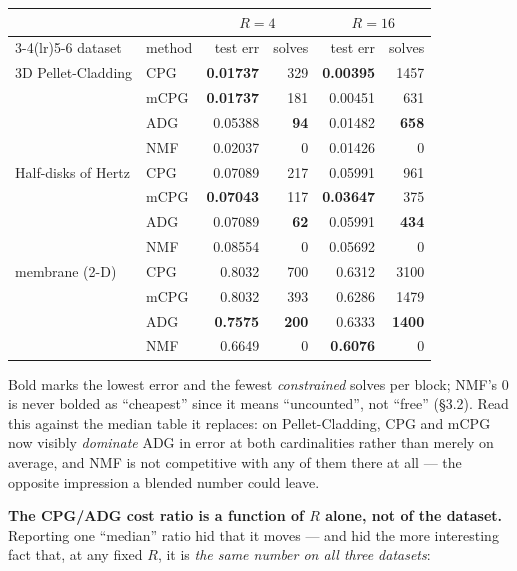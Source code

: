 \documentclass[11pt,a4paper]{article}
\begin{document}
\begin{center}
\begin{tabular}{@{}ll rr rr@{}}
\toprule
& & \multicolumn{2}{c}{$R=4$} & \multicolumn{2}{c}{$R=16$} \\
\cmidrule(lr){3-4}\cmidrule(lr){5-6}
dataset & method & test err & solves & test err & solves \\
\midrule
3D Pellet-Cladding & CPG  & \textbf{0.01737} & 329 & \textbf{0.00395} & 1457 \\
                   & mCPG & \textbf{0.01737} & 181 & 0.00451 & 631 \\
                   & ADG  & 0.05388 & \textbf{94}  & 0.01482 & \textbf{658} \\
                   & NMF  & 0.02037 & 0   & 0.01426 & 0 \\
\midrule
Half-disks of Hertz & CPG  & 0.07089 & 217 & 0.05991 & 961 \\
                    & mCPG & \textbf{0.07043} & 117 & \textbf{0.03647} & 375 \\
                    & ADG  & 0.07089 & \textbf{62}  & 0.05991 & \textbf{434} \\
                    & NMF  & 0.08554 & 0   & 0.05692 & 0 \\
\midrule
membrane (2-D) & CPG  & 0.8032 & 700  & 0.6312 & 3100 \\
               & mCPG & 0.8032 & 393  & 0.6286 & 1479 \\
               & ADG  & \textbf{0.7575} & \textbf{200} & 0.6333 & \textbf{1400} \\
               & NMF  & 0.6649 & 0    & \textbf{0.6076} & 0 \\
\bottomrule
\end{tabular}
\end{center}
\noindent Bold marks the lowest error and the fewest \emph{constrained} solves per block;
NMF's $0$ is never bolded as ``cheapest'' since it means ``uncounted'', not ``free''
(\S3.2). Read this against the median table it replaces: on Pellet-Cladding, CPG and mCPG
now visibly \emph{dominate} ADG in error at both cardinalities rather than merely on
average, and NMF is not competitive with any of them there at all --- the opposite
impression a blended number could leave.

\noindent\textbf{The CPG/ADG cost ratio is a function of $R$ alone, not of the dataset.}
Reporting one ``median'' ratio hid that it moves --- and hid the more interesting fact
that, at any fixed $R$, it is \emph{the same number on all three datasets}:
\end{document}
